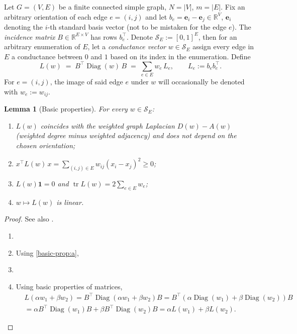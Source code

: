 \documentclass[11pt,a4paper]{article}
\newif\ifdraftnotes
\newcommand{\todo}[1]{\ifdraftnotes{\color{red!70!black}\sffamily[TODO: #1]}\fi}
\theoremstyle{plain}
\newtheorem{lemma}[theorem]{Lemma}
\theoremstyle{definition}
\theoremstyle{remark}
\newcommand{\R}{\mathbb{R}}
\newcommand{\one}{\mathbf{1}}
\DeclareMathOperator{\tr}{tr}
\DeclareMathOperator{\Diag}{Diag}
\begin{document}
	Let \(G=(V,E)\) be a finite connected simple graph, \(N=|V|\), \(m=|E|\). Fix an arbitrary orientation of each edge \(e = (i,j)\)
	and let \(b_e = \bm e_i - \bm e_j\in\R^V\), \(\bm e_i\) denoting the \(i\)-th standard basis vector (not to be mistaken for the edge \(e\)). The \emph{incidence matrix} \(B\in\R^{E\times V}\) has rows \(b_e^\top\). Denote \(\mathcal{S}_E := [0,1]^E\), then for an arbitrary enumeration of \(E\), let a \emph{conductance vector} \(w\in\mathcal{S}_E\) assign every edge in \(E\) a conductance between \(0\) and \(1\) based on its index in the enumeration. Define
	\begin{equation}\label{eq:laplacian}
		L(w) \;=\; B^\top \Diag(w)\, B \;=\; \sum_{e\in E} w_e\, L_e,
		\qquad L_e := b_e b_e^\top .
	\end{equation}
	For \(e = (i,j)\), the image of said edge \(e\) under \(w\) will occasionally be denoted with \(w_e := w_{ij}\).
	\begin{lemma}[Basic properties]\label{lem:laplacian}
		For every \(w\in\mathcal{S}_E\):
		\begin{enumerate}[label=(\alph*)]
			\item\label{basic-prop:a} \(L(w)\) coincides with the weighted graph Laplacian \(D(w)-A(w)\) (weighted degree minus weighted
			adjacency) and does not depend on the chosen orientation;
			\item \(x^\top L(w)\,x = \sum_{(i,j)\in E} w_{ij}(x_i-x_j)^2 \ge 0\);
			\item \(L(w)\one = 0\) and \(\tr L(w) = 2\sum_{e\in E}w_e\);
			\item $w\mapsto L(w)$ is linear.
		\end{enumerate}
	\end{lemma}
	\begin{proof}
		\todo{Entrywise computation of $B^\top\Diag(w)B$; (b) from
			$x^\top L_e x=(b_e^\top x)^2$.} See also \cite{BrouwerHaemers2012}.
		\begin{enumerate}[label=(\alph*)]
			\item 
			\item Using \ref{basic-prop:a},
			\item 
			\item Using basic properties of matrices,
			\begin{align*}
				& L(\alpha w_1 + \beta w_2) = B^\top\Diag\left( \alpha w_1 + \beta w_2 \right)B = B^\top\left( \alpha\Diag(w_1) + \beta\Diag(w_2) \right)B \\
				& = \alpha B^\top\Diag(w_1)B + \beta B^\top\Diag(w_2)B = \alpha L(w_1) + \beta L(w_2).
			\end{align*}
		\end{enumerate}
	\end{proof}
	
\end{document}
